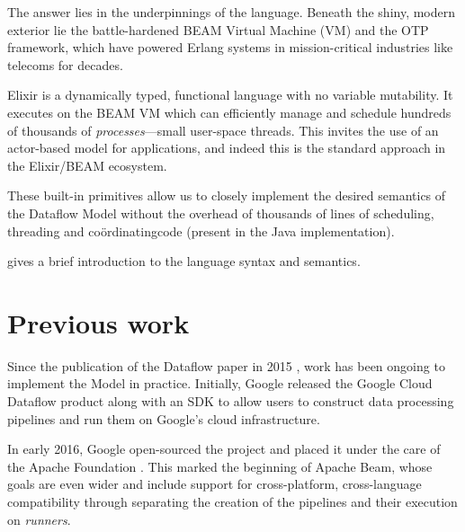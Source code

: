 The answer lies in the underpinnings of the language.
Beneath the shiny, modern exterior lie the battle-hardened BEAM Virtual Machine (VM) and the OTP framework, which have powered Erlang systems in mission-critical industries like telecoms for decades.

Elixir is a dynamically typed, functional language with no variable mutability. 
It executes on the BEAM VM which can efficiently manage and schedule hundreds of thousands of \emph{processes}---small user-space threads.
This invites the use of an actor-based model for applications, and indeed this is the standard approach in the Elixir/BEAM ecosystem.

These built-in primitives allow us to closely implement the desired semantics of the Dataflow Model without the overhead of thousands of lines of scheduling, threading and co\"ordinating\footnotemark[1] code (present in the Java implementation).


 gives a brief introduction to the language syntax and semantics.

\section{Previous work}\label{sec:intro:previous}
Since the publication of the Dataflow paper in 2015 \cite{Akidau:2015}, work has been ongoing to implement the Model in practice.
Initially, Google released the Google Cloud Dataflow product \cite{CloudDataflow} along with an SDK to allow users to construct data processing pipelines and run them on Google's cloud infrastructure.

In early 2016, Google open-sourced the project and placed it under the care of the Apache Foundation \cite{ApacheDataflowPost}.
This marked the beginning of Apache Beam, whose goals are even wider and include support for cross-platform, cross-language compatibility through separating the creation of the pipelines and their execution on \emph{runners}.

